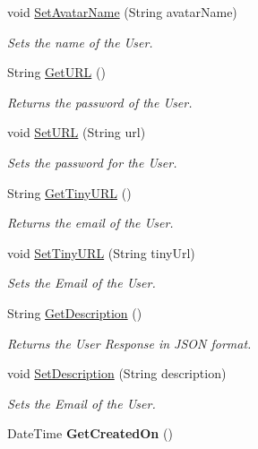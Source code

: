 \begin{DoxyCompactItemize}
\item 
void \hyperlink{classcom_1_1shephertz_1_1app42_1_1paas_1_1sdk_1_1windows_1_1avatar_1_1_avatar_aefe08665c5b657ad56d3e88156a06ede}{Set\+Avatar\+Name} (String avatar\+Name)
\begin{DoxyCompactList}\small\item\em Sets the name of the User. \end{DoxyCompactList}\item 
String \hyperlink{classcom_1_1shephertz_1_1app42_1_1paas_1_1sdk_1_1windows_1_1avatar_1_1_avatar_ad7d2dae89a5927ab5316206561de9b9f}{Get\+U\+R\+L} ()
\begin{DoxyCompactList}\small\item\em Returns the password of the User. \end{DoxyCompactList}\item 
void \hyperlink{classcom_1_1shephertz_1_1app42_1_1paas_1_1sdk_1_1windows_1_1avatar_1_1_avatar_afc5953b73504cbdefa0680a45aaa4ec3}{Set\+U\+R\+L} (String url)
\begin{DoxyCompactList}\small\item\em Sets the password for the User. \end{DoxyCompactList}\item 
String \hyperlink{classcom_1_1shephertz_1_1app42_1_1paas_1_1sdk_1_1windows_1_1avatar_1_1_avatar_a82306a7c9ce11134c7c552b60e458b86}{Get\+Tiny\+U\+R\+L} ()
\begin{DoxyCompactList}\small\item\em Returns the email of the User. \end{DoxyCompactList}\item 
void \hyperlink{classcom_1_1shephertz_1_1app42_1_1paas_1_1sdk_1_1windows_1_1avatar_1_1_avatar_a264b8868f40542ecf4b8507e4259226a}{Set\+Tiny\+U\+R\+L} (String tiny\+Url)
\begin{DoxyCompactList}\small\item\em Sets the Email of the User. \end{DoxyCompactList}\item 
String \hyperlink{classcom_1_1shephertz_1_1app42_1_1paas_1_1sdk_1_1windows_1_1avatar_1_1_avatar_a42b98ce1fcba1f6e0a6f3ce18523725f}{Get\+Description} ()
\begin{DoxyCompactList}\small\item\em Returns the User Response in J\+S\+O\+N format. \end{DoxyCompactList}\item 
void \hyperlink{classcom_1_1shephertz_1_1app42_1_1paas_1_1sdk_1_1windows_1_1avatar_1_1_avatar_a6dd8a08c7b6954666429fa3b8596b036}{Set\+Description} (String description)
\begin{DoxyCompactList}\small\item\em Sets the Email of the User. \end{DoxyCompactList}\item 
\hypertarget{classcom_1_1shephertz_1_1app42_1_1paas_1_1sdk_1_1windows_1_1avatar_1_1_avatar_a3313361c5082263b43ab90fdbdcbc495}{Date\+Time {\bfseries Get\+Created\+On} ()}\label{classcom_1_1shephertz_1_1app42_1_1paas_1_1sdk_1_1windows_1_1avatar_1_1_avatar_a3313361c5082263b43ab90fdbdcbc495}


\end{DoxyCompactItemize}
